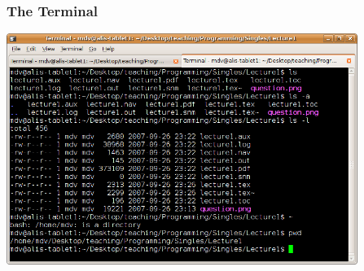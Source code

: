 \begin{frame}\frametitle{The Terminal}
\includegraphics[height=7.5cm,keepaspectratio]{terminal}
\end{frame}

